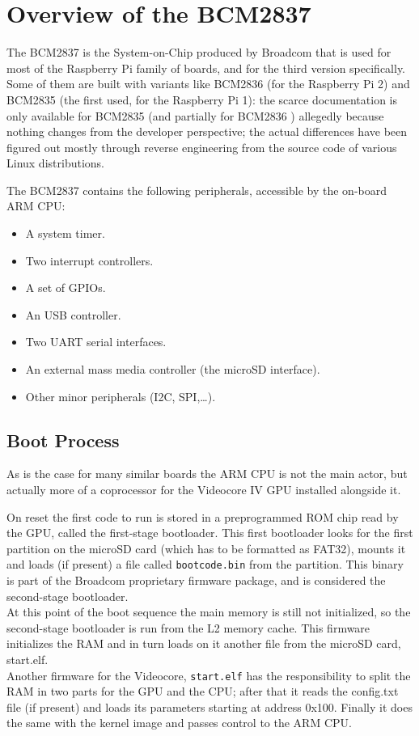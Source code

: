 \documentclass[12pt,a4paper,openright,twoside]{report}
\begin{document}
\clearpage{\pagestyle{empty}\cleardoublepage}
\chapter{Overview of the BCM2837}
The BCM2837 is the System-on-Chip produced by Broadcom that is used for most
of the Raspberry Pi family of boards, and for the third version specifically.
 Some of them are built with variants like BCM2836 (for the Raspberry Pi 2)
  and BCM2835 (the first used, for the Raspberry Pi 1): the scarce documentation
  is only available for BCM2835 \cite{bcm2835} (and partially for BCM2836 \cite{rev3.4})
  allegedly because nothing changes from the developer perspective; the actual 
  differences have been figured out mostly through reverse engineering from the 
  source code of various Linux distributions.

The BCM2837 contains the following peripherals, accessible by the on-board ARM CPU:
\begin{itemize}
    \item A system timer.
    \item Two interrupt controllers.
    \item A set of GPIOs.
    \item An USB controller.
    \item Two UART serial interfaces.
    \item An external mass media controller (the microSD interface).
    \item Other minor peripherals (I2C, SPI,\ldots).
\end{itemize}

\section{Boot Process}
As is the case for many similar boards the ARM CPU is not the main
actor, but actually more of a coprocessor for the Videocore IV GPU installed
alongside it.

On reset the first code to run is stored in a preprogrammed ROM chip read by the GPU,
called the first-stage bootloader. This first bootloader looks for the first
partition on the microSD card (which has to be formatted as FAT32), mounts
it and loads (if present) a file called {\tt bootcode.bin} from the partition.
This binary is part of the Broadcom proprietary firmware package, and is considered
the second-stage bootloader.\\
At this point of the boot sequence the main memory is still not initialized, so the second-stage
bootloader is run from the L2 memory cache. This firmware initializes the RAM 
and in turn loads on it another file from the microSD card, start.elf.\\
Another firmware for the Videocore, {\tt start.elf} has the responsibility to split 
the RAM in two parts for the GPU and the CPU; after that it reads the config.txt 
file (if present) and loads its parameters starting at address 0x100.
 Finally it does the same with the kernel image and passes control to the ARM CPU.
\end{document}
